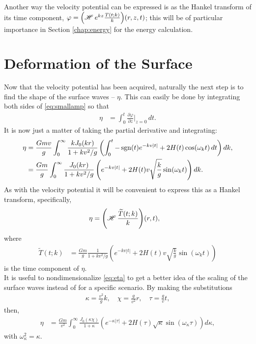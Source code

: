Another way the velocity potential can be expressed is as the Hankel transform of its time component, $\varphi = {\left( \operatorname{\mathscr{H}}_{} e^{kz}\frac{T(t;k)}{k} \right) }(r,z,t)$; this will be of particular importance in Section \ref{chap:energy} for the energy calculation.

\section{Deformation of the Surface}

Now that the velocity potential has been acquired, naturally the next step is to find the shape of the surface waves -- $\eta$. This can easily be done by integrating both sides of \eqref{eq:smallamp} so that 
\begin{align*}
\eta &= \int_0^t \frac{\partial \varphi}{\partial z} \bigg|_{z=0} \, dt.
\end{align*}
It is now just a matter of taking the partial derivative and integrating:
\begin{align}
\eta &= \frac{Gmv}{g} \int_0^\infty \frac{k J_0(kr)}{1+kv^2/g} \left( \int_0^t  -\operatorname{sgn}(t)e^{-kv|t|} + 2H(t)\cos(\omega_k t) \, dt \right) dk, \nonumber \\
&= \frac{Gm}{g} \int_0^\infty \frac{J_0(kr)}{1+kv^2/g} \left( e^{-kv|t|} + 2H(t) v \sqrt{\frac{k}{g}} \sin(\omega_k t) \right) dk.
\label{eq:eta}
\end{align}
As with the velocity potential it will be convenient to express this as a Hankel transform, specifically,
\begin{align*}
\eta &= {\left( \operatorname{\mathscr{H}}_{} \frac{\widetilde{T}(t;k)}{k} \right) }(r,t),
\end{align*}
where
\begin{align*}
\widetilde{T}(t;k) &= \frac{Gm}{g} \frac{1}{1+kv^2/g} \left( e^{-kv|t|} + 2H(t) v \sqrt{\frac{k}{g}} \sin(\omega_k t) \right)
\end{align*}
is the time component of $\eta$. \\

It is useful to nondimensionalize \eqref{eq:eta} to get a better idea of the scaling of the surface waves instead of for a specific scenario. By making the substitutions
\begin{align*}
\kappa = \frac{v^2}{g}k, \quad \chi = \frac{g}{v^2}r, \quad \tau = \frac{g}{v}t,
\end{align*}
then,
\begin{align*}
\eta &= \frac{Gm}{v^2} \int_0^\infty \frac{J_0(\kappa \chi)}{1+\kappa} \left( e^{-\kappa|\tau|} + 2H(\tau) \sqrt{\kappa} \sin(\omega_\kappa \tau) \right) d\kappa,
\end{align*}
with $\omega_\kappa^2 = \kappa$.

